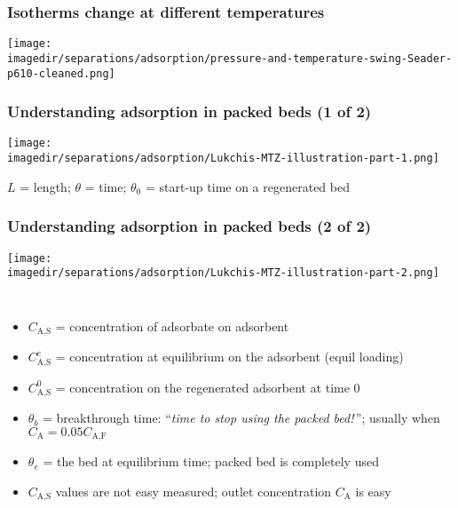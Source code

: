 \begin{frame}\frametitle{Isotherms change at different temperatures}
	\begin{center}
		\texttt{[image: \\imagedir/separations/adsorption/pressure-and-temperature-swing-Seader-p610-cleaned.png]}
	\end{center}
	\vspace{-12pt}
\end{frame}

\begin{frame}\frametitle{Understanding adsorption in packed beds (1 of 2)}
	\begin{center}
		\texttt{[image: \\imagedir/separations/adsorption/Lukchis-MTZ-illustration-part-1.png]}
	\end{center}
	\vspace{-12pt}
	{\footnotesize $L$ = length; $\theta$ = time; $\theta_0$ = start-up time on a regenerated bed}
\end{frame}

\begin{frame}\frametitle{Understanding adsorption in packed beds (2 of 2)}
	\begin{center}
		\texttt{[image: \\imagedir/separations/adsorption/Lukchis-MTZ-illustration-part-2.png]}
	\end{center}
	\vspace{-24pt}
	\vspace{-18pt}
	\begin{columns}[t]
			\begin{itemize}
				\item	{\small $C_\text{A,S}$ = concentration of adsorbate on adsorbent}
				\item	{\small $C_\text{A,S}^e$ = concentration at equilibrium on the adsorbent {\color{myOrange}(equil loading)}}
				\item	{\small $C_\text{A,S}^0$ = concentration on the regenerated adsorbent at time 0}
				\item	{\small $\theta_b$ = breakthrough time: ``\emph{time to stop using the packed bed!\,}''}; usually when $C_\text{A} = 0.05 C_\text{A,F}$
				\item	{\small $\theta_e$ = the bed at equilibrium time; packed bed is completely used}

				\vspace{-5pt}
				\item	{\small $C_\text{A,S}$ values are not easy measured; outlet concentration $C_\text{A}$ is easy}
			\end{itemize}
	\end{columns}
\end{frame}

